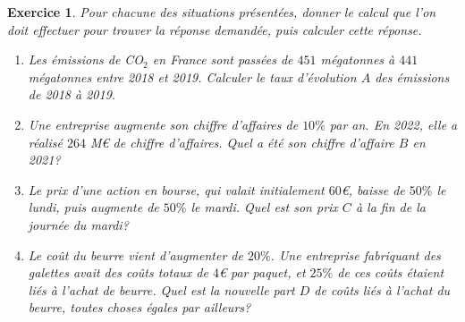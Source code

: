 \documentclass[11pt,a4paper]{exam}
\newtheorem{exo}{Exercice}
\begin{document}
\begin{exo}
    Pour chacune des situations présentées, donner le calcul que l'on doit effectuer pour trouver la réponse demandée, puis calculer cette réponse. 
    \begin{enumerate}
    \item Les émissions de CO$_2$ en France sont passées de $451$ mégatonnes à $441$ mégatonnes entre 2018 et 2019. Calculer le taux d'évolution $A$ des émissions de 2018 à 2019.\newline
    \item Une entreprise augmente son chiffre d'affaires de $10\%$ par an. En 2022, elle a réalisé $264$ M€ de chiffre d'affaires. Quel a été son chiffre d'affaire $B$ en 2021?\newline
    \item Le prix d'une action en bourse, qui valait initialement $60$€, baisse de $50\%$ le lundi, puis augmente de $50\%$ le mardi. Quel est son prix $C$ à la fin de la journée du mardi? \newline
    \item Le coût du beurre vient d'augmenter de $20\%$. Une entreprise fabriquant des galettes avait des coûts totaux de $4$€ par paquet, et $25\%$ de ces coûts étaient liés à l'achat de beurre. Quel est la nouvelle part $D$ de coûts liés à l'achat du beurre, toutes choses égales par ailleurs?  \newline
    \end{enumerate}
\end{exo}
\vspace{1cm}
\end{document}
